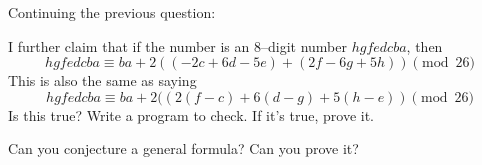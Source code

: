 Continuing the previous question:
  \begin{myenum}
  \item
  I further claim that if the number is an 8--digit number
  $hgfedcba$, then
  \[
    hgfedcba \equiv ba + 2((-2c + 6d - 5e) + (2f - 6g + 5h)) \pmod{26}
  \]
  This is also the same as saying
  \[
    hgfedcba \equiv ba + 2((2(f-c) + 6(d-g) + 5(h-e))  \pmod{26}
  \]  
  Is this true?
  Write a program to check.
  If it's true, prove it.

  \item
  Can you conjecture a general formula?
  Can you prove it?

  \end{myenum}
